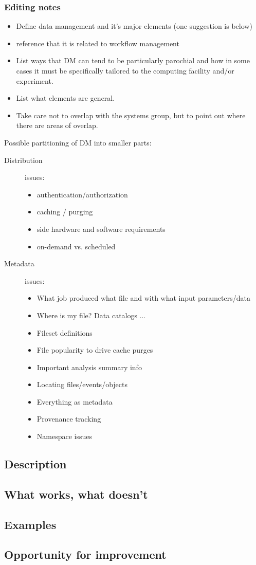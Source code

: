 \subsubsection{Editing notes}


\begin{itemize}
\item Define data management and it's major elements (one suggestion is below)
\item reference that it is related to workflow management
\item List ways that DM can tend to be particularly parochial and how in some cases it must be specifically tailored to the computing facility and/or experiment.
\item List what elements are general.
\item Take care not to overlap with the systems group, but to point out where there are areas of overlap.
\end{itemize}
Possible partitioning of DM into smaller parts:
\begin{description}
\item[Distribution] issues:
  \begin{itemize}
  \item authentication/authorization
  \item caching / purging
  \item side hardware and software requirements
  \item on-demand vs. scheduled
  \end{itemize}
\item[Metadata] issues:
  \begin{itemize}
  \item What job produced what file and with what input parameters/data
  \item Where is my file? Data catalogs ...
  \item Fileset definitions
  \item File popularity to drive cache purges
  \item Important analysis summary info
  \item Locating files/events/objects
  \item Everything as metadata
  \item Provenance tracking
  \item Namespace issues
  \end{itemize}
\end{description}



\subsection{Description}
\subsection{What works, what doesn't}
\subsection{Examples}
\subsection{Opportunity for improvement}

